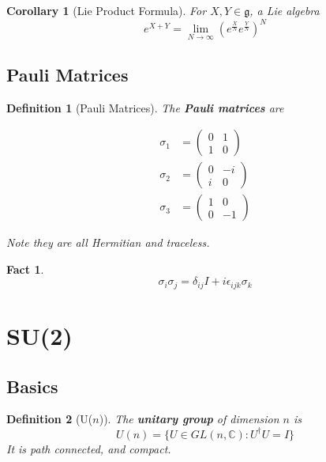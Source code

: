 \documentclass{article}
\newtheorem{corollary}{Corollary}[theorem]
\newtheorem{definition}{Definition}[subsection]
\newtheorem{fact}{Fact}[subsection]
\newcommand{\bam}[1]{\textbf{#1}}
\newcommand{\mf}[1]{\mathfrak{#1}}
\newcommand{\mbb}[1]{\mathbb{#1}}
\newcommand{\be}{\begin{equation}}
\newcommand{\ee}{\end{equation}}
\begin{document}
\begin{corollary}[Lie Product Formula]
For $X,Y\in\mf{g}$, a Lie algebra
\[
e^{X+Y}=\lim_{N\to\infty}\left( e^{\frac{X}{N}} e^{\frac{Y}{N}} \right)^N
\]
\end{corollary}
\subsection{Pauli Matrices}

\begin{definition}[Pauli Matrices]
The \bam{Pauli matrices} are

\begin{align*}
\sigma_1 &= \begin{pmatrix} 0 & 1 \\ 1 & 0\end{pmatrix}  \\
\sigma_2 &= \begin{pmatrix} 0 & -i \\ i & 0\end{pmatrix}  \\
\sigma_3 &= \begin{pmatrix} 1 & 0 \\ 0 & -1\end{pmatrix}  
\end{align*}

Note they are all Hermitian and traceless.
\end{definition}

\begin{fact}
\be
\sigma_i \sigma_j = \delta_{ij}I +i\epsilon_{ijk}\sigma_k
\ee
\end{fact}

\section{SU(2)}
\subsection{Basics}

\begin{definition}[U($n$)]
The \bam{unitary group} of dimension $n$ is 
\[
U\left(n\right)=\lbrace U\in GL\left(n,\mbb{C}\right) : U^\dagger U=I \rbrace
\]
It is path connected, and compact.
\end{definition}
\end{document}
